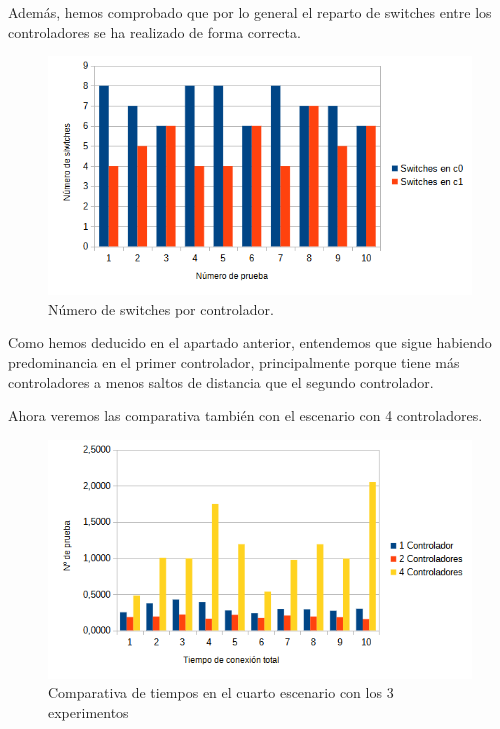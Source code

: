 \documentclass[a4paper, 12pt]{book}
\begin{document}
	
	Además, hemos comprobado que por lo general el reparto de switches entre los controladores se ha realizado de forma correcta.
	
	
	\begin{figure}[H]
		\centering
		\includegraphics[width=16cm, keepaspectratio]{img/switchesporcontrollerescenario3}
		\caption{Número de switches por controlador.}
		\label{figura:switchesporcontrollerescenario4}
	\end{figure}
	
	Como hemos deducido en el apartado anterior, entendemos que sigue habiendo predominancia en el primer controlador, principalmente porque tiene más controladores a menos saltos de distancia que el segundo controlador. 
	
	
	Ahora veremos las comparativa también con el escenario con 4 controladores.
	
	\begin{figure}[H]
		\centering
		\includegraphics[width=16cm, keepaspectratio]{img/comparativaFail}
		\caption{Comparativa de tiempos en el cuarto escenario con los 3 experimentos}
		\label{figura:comparativaFail}
	\end{figure}
	
\end{document}
